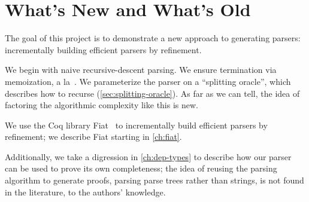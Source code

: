 \section{What's New and What's Old} \label{sec:new} \label{sec:goals}
  The goal of this project is to demonstrate a new approach to generating parsers: incrementally building efficient parsers by refinement.
  
  We begin with naive recursive-descent parsing.  We ensure termination via memoization, a la~\cite{Ridge}.  We parameterize the parser on a ``splitting oracle'', which describes how to recurse (\autoref{sec:splitting-oracle}).  As far as we can tell, the idea of factoring the algorithmic complexity like this is new.
  
  We use the Coq library Fiat~\cite{fiat} to incrementally build efficient parsers by refinement; we describe Fiat starting in \autoref{ch:fiat}.
  
  Additionally, we take a digression in \autoref{ch:dep-types} to describe how our parser can be used to prove its own completeness; the idea of reusing the parsing algorithm to generate proofs, parsing parse trees rather than strings, is not found in the literature, to the authors' knowledge.
